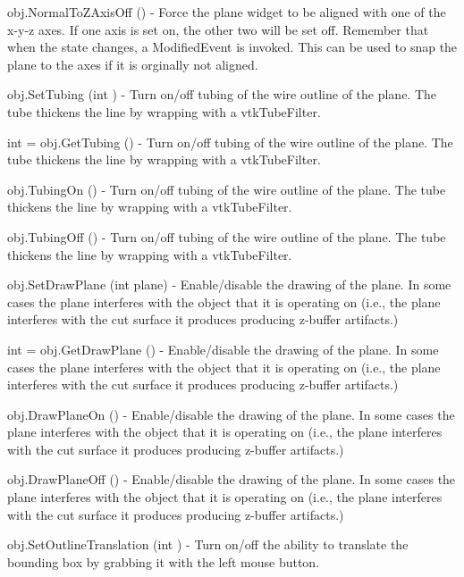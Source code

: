 \begin{DoxyItemize}
\item {\ttfamily obj.\-Normal\-To\-Z\-Axis\-Off ()} -\/ Force the plane widget to be aligned with one of the x-\/y-\/z axes. If one axis is set on, the other two will be set off. Remember that when the state changes, a Modified\-Event is invoked. This can be used to snap the plane to the axes if it is orginally not aligned.  
\item {\ttfamily obj.\-Set\-Tubing (int )} -\/ Turn on/off tubing of the wire outline of the plane. The tube thickens the line by wrapping with a vtk\-Tube\-Filter.  
\item {\ttfamily int = obj.\-Get\-Tubing ()} -\/ Turn on/off tubing of the wire outline of the plane. The tube thickens the line by wrapping with a vtk\-Tube\-Filter.  
\item {\ttfamily obj.\-Tubing\-On ()} -\/ Turn on/off tubing of the wire outline of the plane. The tube thickens the line by wrapping with a vtk\-Tube\-Filter.  
\item {\ttfamily obj.\-Tubing\-Off ()} -\/ Turn on/off tubing of the wire outline of the plane. The tube thickens the line by wrapping with a vtk\-Tube\-Filter.  
\item {\ttfamily obj.\-Set\-Draw\-Plane (int plane)} -\/ Enable/disable the drawing of the plane. In some cases the plane interferes with the object that it is operating on (i.\-e., the plane interferes with the cut surface it produces producing z-\/buffer artifacts.)  
\item {\ttfamily int = obj.\-Get\-Draw\-Plane ()} -\/ Enable/disable the drawing of the plane. In some cases the plane interferes with the object that it is operating on (i.\-e., the plane interferes with the cut surface it produces producing z-\/buffer artifacts.)  
\item {\ttfamily obj.\-Draw\-Plane\-On ()} -\/ Enable/disable the drawing of the plane. In some cases the plane interferes with the object that it is operating on (i.\-e., the plane interferes with the cut surface it produces producing z-\/buffer artifacts.)  
\item {\ttfamily obj.\-Draw\-Plane\-Off ()} -\/ Enable/disable the drawing of the plane. In some cases the plane interferes with the object that it is operating on (i.\-e., the plane interferes with the cut surface it produces producing z-\/buffer artifacts.)  
\item {\ttfamily obj.\-Set\-Outline\-Translation (int )} -\/ Turn on/off the ability to translate the bounding box by grabbing it with the left mouse button.  

\end{DoxyItemize}
